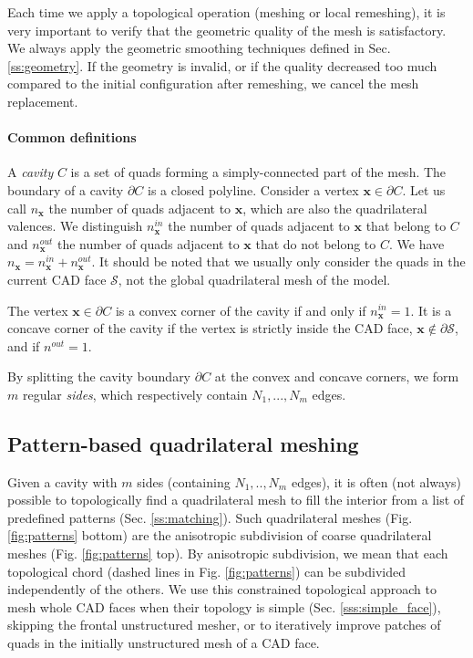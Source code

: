 \documentclass[AMA,STIX1COL]{WileyNJD-v2}
\newcommand{\vx}{\ensuremath{\mathbf{x}}}
\newcommand{\surface}{\ensuremath{\mathcal{S}}}
\newcommand\note[1]{\textcolor{red}{// #1}\\}
\newcommand\rsec[1]{Sec. \ref{#1}}
\newcommand\rfig[1]{Fig. \ref{#1}}
\begin{document}
{Each time we apply a topological operation (meshing or local remeshing), it is
very important to verify that the geometric quality of the mesh is
satisfactory. We always apply the geometric smoothing techniques defined in
\rsec{ss:geometry}. If the geometry is invalid,
or if the quality decreased too much compared to the initial configuration
after remeshing, we cancel the mesh replacement.

\paragraph{Common definitions}
A \emph{cavity} $C$ is a set of quads forming a
simply-connected part of the mesh. The boundary of a cavity $\partial
C$ is a closed polyline. Consider a vertex $\vx \in \partial C$. Let us
call $n_{\vx}$ the number of quads adjacent to $\vx$, which are
also the quadrilateral valences. We distinguish
$n^{in}_{\vx}$ the number of quads adjacent to $\vx$ that belong to
$C$ and $n^{out}_{\vx}$ the number of quads adjacent to $\vx$ that do
not belong to $C$. We have $n_{\vx}=n^{in}_{\vx} + n^{out}_{\vx}$.
It should be noted that we usually only consider the quads in the current CAD face $\surface$, 
not the global quadrilateral mesh of the model.

The vertex $\vx \in \partial C$ is a convex corner of the cavity if and only if $n^{in}_{\vx}=1$.
It is a concave corner of the cavity if the vertex is strictly inside the CAD face, 
$\vx \notin \partial \surface$, and if $n^{out}=1$.

By splitting the cavity boundary $\partial C$ at the convex and concave
corners, we form $m$ regular \emph{sides}, which respectively contain 
$N_1, ..., N_m$ edges.



\subsection{Pattern-based quadrilateral meshing}
\label{sec:pattern}

Given a cavity with $m$ sides (containing $N_1,..,N_m$ edges), it is often
(not always) possible to topologically find a quadrilateral mesh to fill
the interior from a list of predefined patterns (\rsec{ss:matching}). 
Such quadrilateral meshes (\rfig{fig:patterns} bottom) are
the anisotropic subdivision of coarse quadrilateral meshes
(\rfig{fig:patterns} top). By anisotropic subdivision, we mean that each 
topological chord (dashed lines in \rfig{fig:patterns}) can be subdivided
independently of the others. We use this constrained topological 
approach to mesh whole CAD faces when their topology is simple (\rsec{sss:simple_face}),
skipping the frontal unstructured mesher, or to iteratively improve patches of quads
in the initially unstructured mesh of a CAD face.

}
\end{document}

